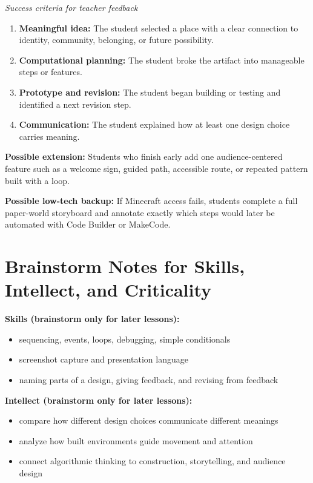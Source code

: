 \documentclass[11pt]{article}
\begin{document}
\textit{Success criteria for teacher feedback}
\begin{enumerate}[leftmargin=*]
    \item \textbf{Meaningful idea:} The student selected a place with a clear connection to identity, community, belonging, or future possibility.
    \item \textbf{Computational planning:} The student broke the artifact into manageable steps or features.
    \item \textbf{Prototype and revision:} The student began building or testing and identified a next revision step.
    \item \textbf{Communication:} The student explained how at least one design choice carries meaning.
\end{enumerate}

\textbf{Possible extension:}
Students who finish early add one audience-centered feature such as a welcome sign, guided path, accessible route, or repeated pattern built with a loop.

\textbf{Possible low-tech backup:}
If Minecraft access fails, students complete a full paper-world storyboard and annotate exactly which steps would later be automated with Code Builder or MakeCode.

\section*{Brainstorm Notes for Skills, Intellect, and Criticality}

\textbf{Skills (brainstorm only for later lessons):}
\begin{itemize}[leftmargin=*]
    \item sequencing, events, loops, debugging, simple conditionals
    \item screenshot capture and presentation language
    \item naming parts of a design, giving feedback, and revising from feedback
\end{itemize}

\textbf{Intellect (brainstorm only for later lessons):}
\begin{itemize}[leftmargin=*]
    \item compare how different design choices communicate different meanings
    \item analyze how built environments guide movement and attention
    \item connect algorithmic thinking to construction, storytelling, and audience design
\end{itemize}
\end{document}
